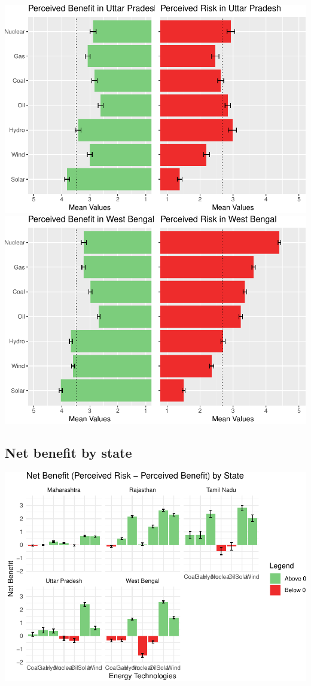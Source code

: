\documentclass[
]{article}
\begin{document}
\includegraphics{nuclear-in-comparison_files/figure-latex/unnamed-chunk-18-4.pdf}
\includegraphics{nuclear-in-comparison_files/figure-latex/unnamed-chunk-18-5.pdf}

\hypertarget{net-benefit-by-state}{%
\subsection{Net benefit by state}\label{net-benefit-by-state}}

\includegraphics{nuclear-in-comparison_files/figure-latex/unnamed-chunk-20-1.pdf}
\end{document}
